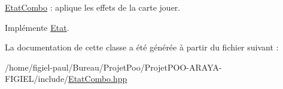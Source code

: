 \hyperlink{class_etat_combo}{Etat\-Combo} \-: aplique les effets de la carte jouer. 



Implémente \hyperlink{class_etat_aaf949c7b45217b76ff68414e61ef0d2a}{Etat}.



La documentation de cette classe a été générée à partir du fichier suivant \-:\begin{DoxyCompactItemize}
\item 
/home/figiel-\/paul/\-Bureau/\-Projet\-Poo/\-Projet\-P\-O\-O-\/\-A\-R\-A\-Y\-A-\/\-F\-I\-G\-I\-E\-L/include/\hyperlink{_etat_combo_8hpp}{Etat\-Combo.\-hpp}\end{DoxyCompactItemize}
